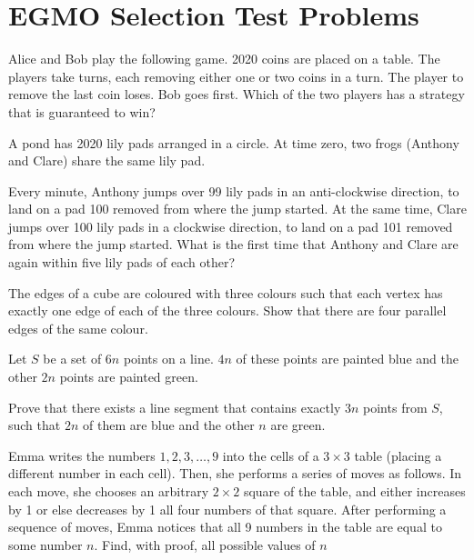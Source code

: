 \documentclass{pset}
\begin{document}
\section*{EGMO Selection Test Problems}

\begin{problems}

\begin{problem}
    Alice and Bob play the following game. 2020 coins are placed on a table. The players take turns, each removing either one or two coins in a turn. The player to remove the last coin loses. Bob goes first. Which of the two players has a strategy that is guaranteed to win?
\end{problem}

\begin{problem}
    A pond has 2020 lily pads arranged in a circle. At time zero, two frogs (Anthony and Clare) share the same lily pad.

    Every minute, Anthony jumps over 99 lily pads in an anti-clockwise direction, to land on a pad 100 removed from where the jump started. At the same time, Clare jumps over 100 lily pads in a clockwise direction, to land on a pad 101 removed from where the jump started. What is the first time that Anthony and Clare are again within five lily pads of each other?
\end{problem}

\begin{problem}
    The edges of a cube are coloured with three colours such that each vertex has exactly one edge of each of the three colours. Show that there are four parallel edges of the same colour.
\end{problem}

\begin{problem}
    Let \(S\) be a set of \(6 n\) points on a line. \(4 n\) of these points are painted blue and the other \(2 n\) points are painted green.

    Prove that there exists a line segment that contains exactly \(3 n\) points from \(S\), such that \(2 n\) of them are blue and the other \(n\) are green.
\end{problem}

\begin{problem}
    Emma writes the numbers \(1,2,3, \ldots, 9\) into the cells of a \(3 \times 3\) table (placing a different number in each cell). Then, she performs a series of moves as follows. In each move, she chooses an arbitrary \(2 \times 2\) square of the table, and either increases by 1 or else decreases by 1 all four numbers of that square. After performing a sequence of moves, Emma notices that all 9 numbers in the table are equal to some number \(n .\) Find, with proof, all possible values of \(n\)
\end{problem}


\end{problems}
\end{document}
